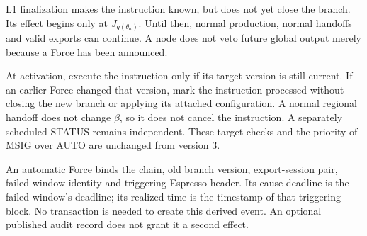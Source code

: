 \documentclass[11pt,a4paper]{article}
\begin{document}
L1 finalization makes the instruction known, but does not yet close
the branch. Its effect begins only at $J_{q(\theta_a)}$.
Until then, normal production, normal handoffs and valid exports can
continue. A node does not veto future global output merely because a
Force has been announced.

At activation, execute the instruction only if its target version is
still current. If an earlier Force changed that version, mark the
instruction processed without closing the new branch or applying its
attached configuration. A normal regional handoff does not change
$\beta$, so it does not cancel the instruction. A separately scheduled
STATUS remains independent. These target checks and the priority of
MSIG over AUTO are unchanged from version 3.

An automatic Force binds the chain, old branch version, export-session pair,
failed-window identity and triggering Espresso header. Its cause
deadline is the failed window's deadline; its realized time is the
timestamp of that triggering block. No transaction is needed to create
this derived event. An optional published audit record does not grant
it a second effect.
\end{document}

